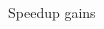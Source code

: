 \begin{frame}[fragile]
\begin{columns}[t]
\begin{column}{6cm}
\begin{alertblock}{Speedup gains}
  \end{alertblock}
  
\end{column}

  \end{columns}
\end{frame}


